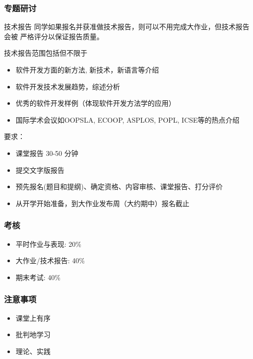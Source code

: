 \documentclass[compress]{beamer}
\begin{document}
\begin{frame}
  \frametitle{专题研讨}

   {
  \begin{block}{技术报告}
      同学如果报名并获准做技术报告，则可以不用完成大作业，但技术报告会被
      严格评分以保证报告质量。
  \end{block}

  技术报告范围包括但不限于

  \begin{itemize}
    \item 软件开发方面的新方法, 新技术，新语言等介绍
    \item 软件开发技术发展趋势，综述分析
    \item 优秀的软件开发样例（体现软件开发方法学的应用）
    \item 国际学术会议如OOPSLA, ECOOP, ASPLOS, POPL, ICSE等的热点介绍
  \end{itemize}
  }

   {
      要求：

      \begin{itemize}
          \item 课堂报告 30-50 分钟
          \item 提交文字版报告
          \item 预先报名(题目和提纲)、确定资格、内容审核、课堂报告、打分评价
          \item 从开学开始准备，到大作业发布周（大约期中）报名截止
      \end{itemize}
  }
\end{frame}


\begin{frame}
  \frametitle{考核}
  \begin{itemize}
    \item 平时作业与表现: 20\%
    \item 大作业/技术报告: 40\%
    \item 期末考试: 40\%
  \end{itemize}
\end{frame}

\begin{frame}
  \frametitle{注意事项}
  \begin{itemize}
    \item 课堂上有序
    \item 批判地学习
    \item 理论、实践
  \end{itemize}
\end{frame}
\end{document}
